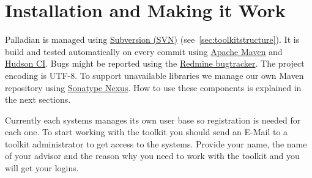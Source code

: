 \documentclass[a4paper,twoside]{book}      %
\begin{document}
\chapter{Installation and Making it Work}
Palladian is managed using \href{http://subversion.apache.org/}{Subversion (SVN)} (see~\ref{sec:toolkitstructure}). It is build and tested automatically on every commit using \href{http://maven.apache.org/}{Apache Maven} and \href{http://hudson-ci.org/}{Hudson CI}. Bugs might be reported using the \href{http://www.redmine.org/}{Redmine bugtracker}. The project encoding is UTF-8. To support unavailable libraries we manage our own Maven repository using \href{http://nexus.sonatype.org/}{Sonatype Nexus}. How to use these components is explained in the next sections.

Currently each systems manages its own user base so registration is needed for each one. To start working with the toolkit you should send an E-Mail to a toolkit administrator to get access to the systems. Provide your name, the name of your advisor and the reason why you need to work with the toolkit and you will get your logins.
\end{document}
